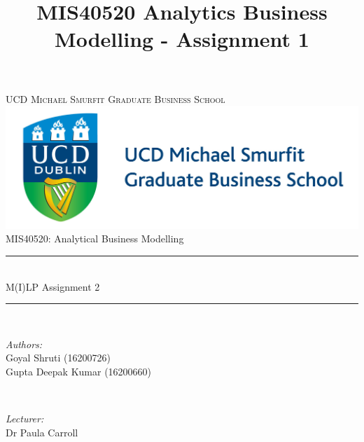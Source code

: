 \documentclass[paper=a4, fontsize=11pt]{scrartcl} %
\title{MIS40520 Analytics Business Modelling - Assignment 1}
\begin{document}
\begin{titlepage}
\newcommand{\HRule}{\rule{\linewidth}{0.5mm}} %
\center %

\textsc{\LARGE UCD Michael Smurfit Graduate Business School}\\[1.7cm] %
\includegraphics[scale = 0.7]{logo.png} \\ [1cm]
\textrm{\Large	\textrm{MIS40520: Analytical Business Modelling}}\\[0.6cm] %


\HRule \\[0.5cm]
{ \LARGE  \textrm{M(I)LP Assignment 2}}\\[0.5cm] %
\HRule \\[1.5cm]
 

\begin{minipage}{0.45\textwidth}
\begin{flushleft} \large
\emph{\textrm{Authors:}}\\
\normalsize{Goyal \textrm{Shruti} (16200726)}\\
\normalsize{Gupta \textrm{Deepak Kumar} (16200660) }\\
\end{flushleft}
\end{minipage}
~
~
\begin{minipage}{0.45\textwidth}
\begin{flushright} \large
\emph{\textrm{Lecturer:}} \\
\normalsize{Dr Paula \textrm{Carroll}} %
\end{flushright}
\end{minipage}\\[3cm]


\end{titlepage}
\end{document}
